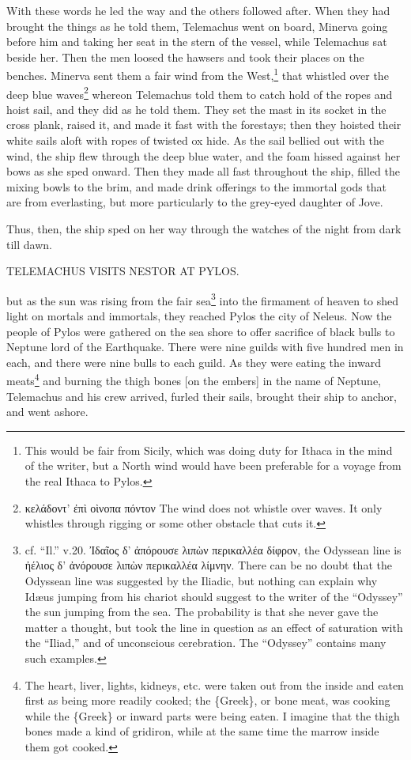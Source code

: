 With these words he led the way and the others followed after. When they had
brought the things as he told them, Telemachus went on board, Minerva going
before him and taking her seat in the stern of the vessel, while Telemachus sat
beside her. Then the men loosed the hawsers and took their places on the
benches. Minerva sent them a fair wind from the West,\footnote{This would be fair from Sicily, which was doing duty for Ithaca in the mind
of the writer, but a North wind would have been preferable for a voyage from
the real Ithaca to Pylos.} that whistled over the deep blue
waves\footnote{κελάδοντ’ ἐπὶ
οὶνοπα πόντον
The wind does not whistle over waves. It only whistles through rigging or some
other obstacle that cuts it.} whereon
Telemachus told them to catch hold of the ropes and hoist sail, and they did as
he told them. They set the mast in its socket in the cross plank, raised it,
and made it fast with the forestays; then they hoisted their white sails aloft
with ropes of twisted ox hide. As the sail bellied out with the wind, the ship
flew through the deep blue water, and the foam hissed against her bows as she
sped onward. Then they made all fast throughout the ship, filled the mixing
bowls to the brim, and made drink offerings to the immortal gods that are from
everlasting, but more particularly to the grey-eyed daughter of Jove.

Thus, then, the ship sped on her way through the watches of the night from dark
till dawn.


TELEMACHUS VISITS NESTOR AT PYLOS.

but as the sun was rising from the fair sea\footnote{cf. “Il.” v.20. Ἰδαῖος δ’
ἀπόρουσε
λιπὼν
περικαλλέα
δίφρον, the Odyssean line is
ἠέλιος δ’
ἀνόρουσε
λιπὼν
περικαλλέα
λίμνην. There can be no doubt that the Odyssean
line was suggested by the Iliadic, but nothing can explain why Idæus jumping
from his chariot should suggest to the writer of the “Odyssey” the sun jumping
from the sea. The probability is that she never gave the matter a thought, but
took the line in question as an effect of saturation with the “Iliad,” and of
unconscious cerebration. The “Odyssey” contains many such examples.} into the firmament of heaven to shed
light on mortals and immortals, they reached Pylos the city of Neleus. Now the
people of Pylos were gathered on the sea shore to offer sacrifice of black
bulls to Neptune lord of the Earthquake. There were nine guilds with five
hundred men in each, and there were nine bulls to each guild. As they were
eating the inward meats\footnote{The heart, liver, lights, kidneys, etc. were taken out from the inside and
eaten first as being more readily cooked; the \{Greek\}, or bone meat, was
cooking while the \{Greek\} or inward parts were being eaten. I imagine that the
thigh bones made a kind of gridiron, while at the same time the marrow inside
them got cooked.} and burning the thigh bones [on the
embers] in the name of Neptune, Telemachus and his crew arrived, furled their
sails, brought their ship to anchor, and went ashore.

